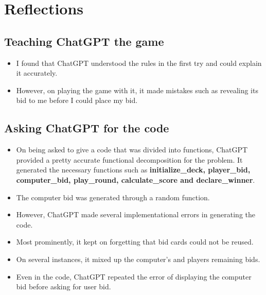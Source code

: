 \documentclass{article}
\begin{document}
\section{Reflections}
\subsection{Teaching ChatGPT the game }
\begin{itemize}
\item I found that ChatGPT understood the rules in the first try and could explain it accurately.
\item However, on playing the game with it, it made mistakes such as revealing its bid to me before I could place my bid.
\end{itemize}
\subsection{Asking ChatGPT for the code}
\begin{itemize}
\item On being asked to give a code that was divided into functions, ChatGPT provided a pretty accurate functional decomposition for the problem. It generated the necessary functions such as \textbf{initialize\_deck, player\_bid, computer\_bid, play\_round, calculate\_score and declare\_winner}.
\item The computer bid was generated through a random function.
\item However, ChatGPT made several implementational errors in generating the code.
\item Most prominently, it kept on forgetting that bid cards could not be reused.
\item  On several instances, it mixed up the computer's and players remaining bids.
\item Even in the code, ChatGPT repeated the error of displaying the computer bid before asking for user bid.
\end{itemize}
\end{document}
